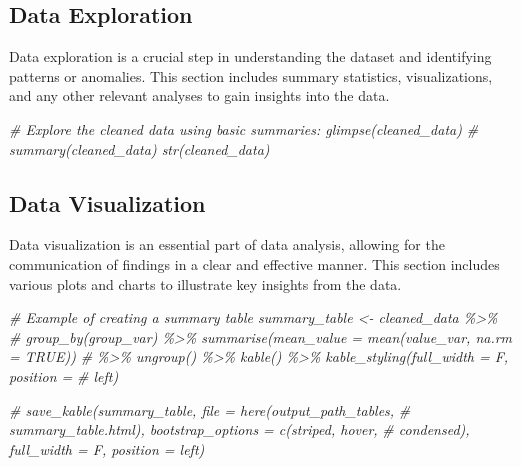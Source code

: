 \documentclass[
  12pt,
]{article}
\newenvironment{Shaded}{\begin{snugshade}}{\end{snugshade}}
\newcommand{\CommentTok}[1]{\textcolor[rgb]{0.56,0.35,0.01}{\textit{#1}}}
\begin{document}
\subsection{Data Exploration}\label{data-exploration}

Data exploration is a crucial step in understanding the dataset and
identifying patterns or anomalies. This section includes summary
statistics, visualizations, and any other relevant analyses to gain
insights into the data.

\begin{Shaded}
\begin{Highlighting}[]
\CommentTok{\# Explore the cleaned data using basic summaries: glimpse(cleaned\_data)}
\CommentTok{\# summary(cleaned\_data) str(cleaned\_data)}
\end{Highlighting}
\end{Shaded}

\subsection{Data Visualization}\label{data-visualization}

Data visualization is an essential part of data analysis, allowing for
the communication of findings in a clear and effective manner. This
section includes various plots and charts to illustrate key insights
from the data.

\begin{Shaded}
\begin{Highlighting}[]
\CommentTok{\# Example of creating a summary table summary\_table \textless{}{-} cleaned\_data \%\textgreater{}\%}
\CommentTok{\# group\_by(group\_var) \%\textgreater{}\% summarise(mean\_value = mean(value\_var, na.rm = TRUE))}
\CommentTok{\# \%\textgreater{}\% ungroup() \%\textgreater{}\% kable() \%\textgreater{}\% kable\_styling(full\_width = F, position =}
\CommentTok{\# \textquotesingle{}left\textquotesingle{})}

\CommentTok{\# save\_kable(summary\_table, file = here(output\_path\_tables,}
\CommentTok{\# \textquotesingle{}summary\_table.html\textquotesingle{}), bootstrap\_options = c(\textquotesingle{}striped\textquotesingle{}, \textquotesingle{}hover\textquotesingle{},}
\CommentTok{\# \textquotesingle{}condensed\textquotesingle{}), full\_width = F, position = \textquotesingle{}left\textquotesingle{})}
\end{Highlighting}
\end{Shaded}
\end{document}
